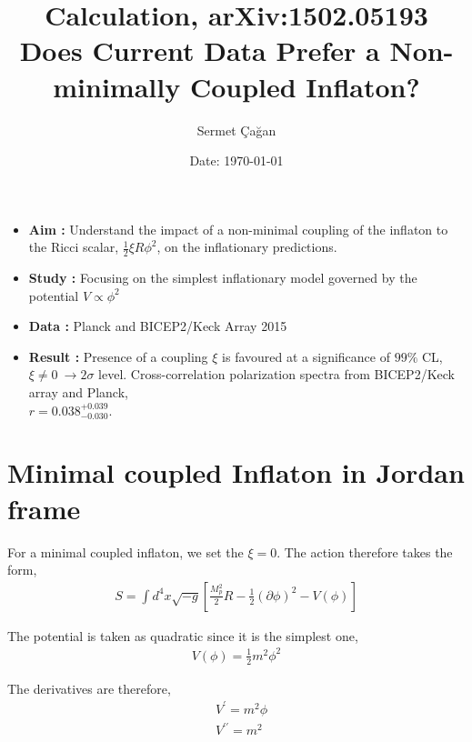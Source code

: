 


\title{\textbf{Calculation, arXiv:1502.05193\\Does Current Data Prefer a Non-minimally Coupled Inflaton?}}
\author{Sermet \c{C}a\u{g}an}
\date{Date: \today}



\maketitle
\vspace{2cm}
\begin{itemize}
\item \textbf{Aim :} Understand the impact of a non-minimal coupling of the inflaton to the Ricci scalar, $\frac{1}{2}\xi R\phi^{2}$, on the inflationary predictions.
\item \textbf{Study :} Focusing on the simplest inflationary model governed by the potential $V \propto \phi^{2}$
\item \textbf{Data :} Planck and BICEP2/Keck Array 2015
\item \textbf{Result :} Presence of a coupling $\xi$ is favoured at a significance of $99\%$ CL, $\xi \ne 0 \ \rightarrow 2\sigma$ level. Cross-correlation polarization spectra from BICEP2/Keck array and Planck,\\ $r = 0.038 ^{+0.039} _{-0.030}$.
\end{itemize}
\newpage

\section{Minimal coupled Inflaton in Jordan frame}

For a minimal coupled inflaton, we set the $\xi = 0$. The action therefore takes the form,
\begin{align}
S = \int d^{4}x \sqrt{-g}\left[\frac{M_{p}^{2}}{2}R - \frac{1}{2}\left(\partial\phi\right)^{2} - V\left(\phi\right)\right]
\end{align}

The potential is taken as quadratic since it is the simplest one,
\begin{align}
V\left(\phi\right) = \frac{1}{2}m^{2}\phi^{2}
\end{align}

The derivatives are therefore,
\begin{align}
&V^{\prime} = m^{2}\phi\\
&V^{\prime\prime} = m^{2}
\end{align}

